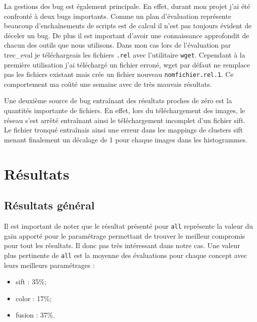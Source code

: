 \documentclass[a4paper, 11pt]{article}
\begin{document}
La gestions des bug est également principale. En effet, durant mon projet j'ai été confronté à deux bugs importants. Comme un plan d'évaluation représente beaucoup d'enchaînements de scripts est de calcul il n'est pas toujours évident de déceler un bug. De plus il est important d'avoir une connaissance approfondit de chacun des outils que nous utilisons. Dans mon cas lors de l'évaluation par trec\_eval je téléchargeais les fichiers \texttt{.rel} avec l'utilitaire \texttt{wget}. Cependant à la première utilisation j'ai téléchargé un fichier erroné, wget par défaut ne remplace pas les fichiers existant mais crée un fichier nouveau \texttt{nomfichier.rel.1}. Ce comportement ma coûté une semaine avec de très mauvais résultats.

Une deuxième source de bug entraînant des résultats proches de zéro est la quantités importante de fichiers. En effet, lors du téléchargement des images, le réseau s'est arrêté entraînant ainsi le téléchargement incomplet d'un fichier sift. Le fichier tronqué entraînais ainsi une erreur dans les mappings de clusters sift menant finalement un décalage de 1 pour chaque images dans les histogrammes.

\section{Résultats}
\subsection{Résultats général}
Il est important de noter que le résultat présenté pour \texttt{all} représente la valeur du gain apporté pour le paramétrage permettant de trouver le meilleur compromis pour tout les résultats. Il donc pas très intéressant dans notre cas. Une valeur plus pertinente de \texttt{all} est la moyenne des évaluations pour chaque concept avec leurs meilleurs paramétrages :
\begin{itemize}
	\item sift  : 35\%;
	\item color : 17\%;
	\item fusion : 37\%.
\end{itemize}

\begin{center}
\end{center}
\end{document}
